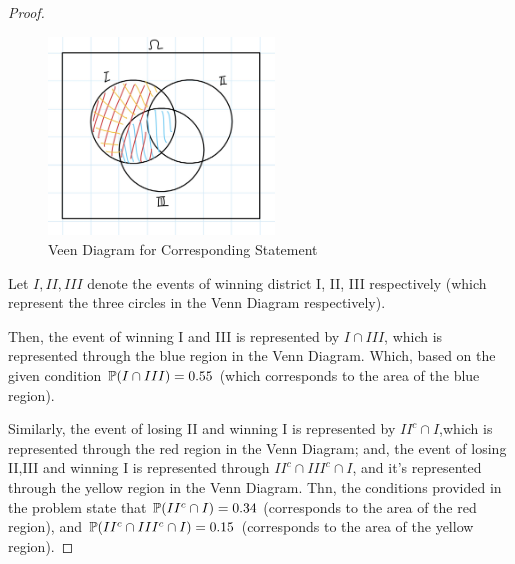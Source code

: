 \documentclass{article}
\begin{document}
\begin{proof}

    \hfil

    \begin{figure}[h!]
        \begin{center}
            \includegraphics[width=60mm]{IMG_0702.jpg}
            \caption{Veen Diagram for Corresponding Statement}
        \end{center}
    \end{figure}

    Let $I, II, III$ denote the events of winning district I, II, III respectively (which represent the three circles in the Venn Diagram respectively). 
    
    Then, the event of winning I and III is represented by $I \cap III$, which is represented through the blue region in the Venn Diagram. Which, based on the given condition $\mathbb{P}(I\cap III)=0.55$ (which corresponds to the area of the blue region).

    Similarly, the event of losing II and winning I is represented by $II^c \cap I$,which is represented through the red region in the Venn Diagram; and, the event of losing II,III and winning I is represented through $II^c \cap III^c\cap I$, and it's represented through the yellow region in the Venn Diagram. Thn, the conditions provided in the problem state that $\mathbb{P}(II^c\cap I)=0.34$ (corresponds to the area of the red region), and $\mathbb{P}(II^c\cap III^c\cap I)=0.15$ (corresponds to the area of the yellow region).

    \hfil


\end{proof}
\end{document}
